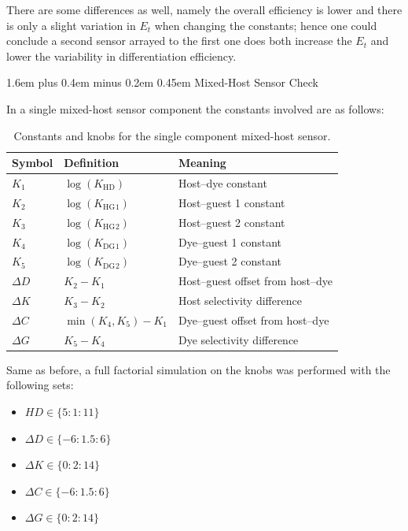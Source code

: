 \documentclass[11pt]{article}
\makeatletter
\newcommand{\KHD}{K_{\mathrm{HD}}}
\newcommand{\KHG}{K_{\mathrm{HG}}}
\newcommand{\KDG}{K_{\mathrm{DG}}}
\newcommand{\Et}{E_t}
\renewcommand\section{\@startsection{section}{1}{0pt}%
    {1.6em plus 0.4em minus 0.2em}%
    {0.45em}%
    {\normalfont\Large\bfseries\color{reportblue}}}
\makeatother
\begin{document}
There are some differences as well, namely the overall efficiency is lower and
there is only a slight variation in $\Et$ when changing the constants; hence one
could conclude a second sensor arrayed to the first one does both increase the
$\Et$ and lower the variability in differentiation efficiency.

\section{Mixed-Host Sensor Check}

In a single mixed-host sensor component the constants involved are as follows:
\begin{table}[H]
\centering
\caption{Constants and knobs for the single component mixed-host sensor.}
\label{tab:single_mixed_constants}
\renewcommand{\arraystretch}{1.15}
\begin{tabular}{lll}
\toprule
Symbol & Definition & Meaning \\
\midrule
$K_1$ & $\log(\KHD)$ & Host--dye constant \\
$K_2$ & $\log(\KHG{}_{1})$ & Host--guest 1 constant \\
$K_3$ & $\log(\KHG{}_{2})$ & Host--guest 2 constant \\
$K_4$ & $\log(\KDG{}_{1})$ & Dye--guest 1 constant \\
$K_5$ & $\log(\KDG{}_{2})$ & Dye--guest 2 constant \\
$\Delta D$ & $K_2-K_1$ & Host--guest offset from host--dye \\
$\Delta K$ & $K_3-K_2$ & Host selectivity difference \\
$\Delta C$ & $\min(K_4,K_5)-K_1$ & Dye--guest offset from host--dye \\
$\Delta G$ & $K_5-K_4$ & Dye selectivity difference \\
\bottomrule
\end{tabular}
\end{table}

Same as before, a full factorial simulation on the knobs was performed with the
following sets:
\begin{itemize}
    \item $HD \in \{5:1:11\}$
    \item $\Delta D \in \{-6:1.5:6\}$
    \item $\Delta K \in \{0:2:14\}$
    \item $\Delta C \in \{-6:1.5:6\}$
    \item $\Delta G \in \{0:2:14\}$
\end{itemize}
\end{document}
